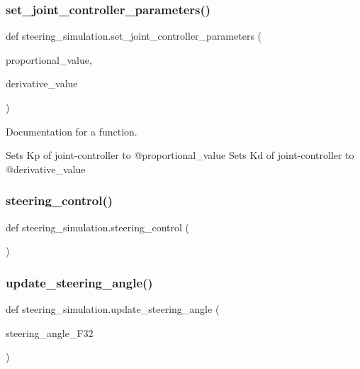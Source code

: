 \subsubsection{\texorpdfstring{set\_joint\_controller\_parameters()}{set\_joint\_controller\_parameters()}}
{\footnotesize\ttfamily def steering\+\_\+simulation.\+set\+\_\+joint\+\_\+controller\+\_\+parameters (\begin{DoxyParamCaption}\item[{}]{proportional\+\_\+value,  }\item[{}]{derivative\+\_\+value }\end{DoxyParamCaption})}



Documentation for a function. 

Sets Kp of joint-\/controller to @proportional\+\_\+value Sets Kd of joint-\/controller to @derivative\+\_\+value \mbox{\label{namespacesteering__simulation_a7e6cf517d5eedfae29bc0b05bada6a3e}} 
\subsubsection{\texorpdfstring{steering\_control()}{steering\_control()}}
{\footnotesize\ttfamily def steering\+\_\+simulation.\+steering\+\_\+control (\begin{DoxyParamCaption}{ }\end{DoxyParamCaption})}

\mbox{\label{namespacesteering__simulation_ade71f08294031e29a94a9be5cc1f0961}} 
\subsubsection{\texorpdfstring{update\_steering\_angle()}{update\_steering\_angle()}}
{\footnotesize\ttfamily def steering\+\_\+simulation.\+update\+\_\+steering\+\_\+angle (\begin{DoxyParamCaption}\item[{}]{steering\+\_\+angle\+\_\+\+F32 }\end{DoxyParamCaption})}



